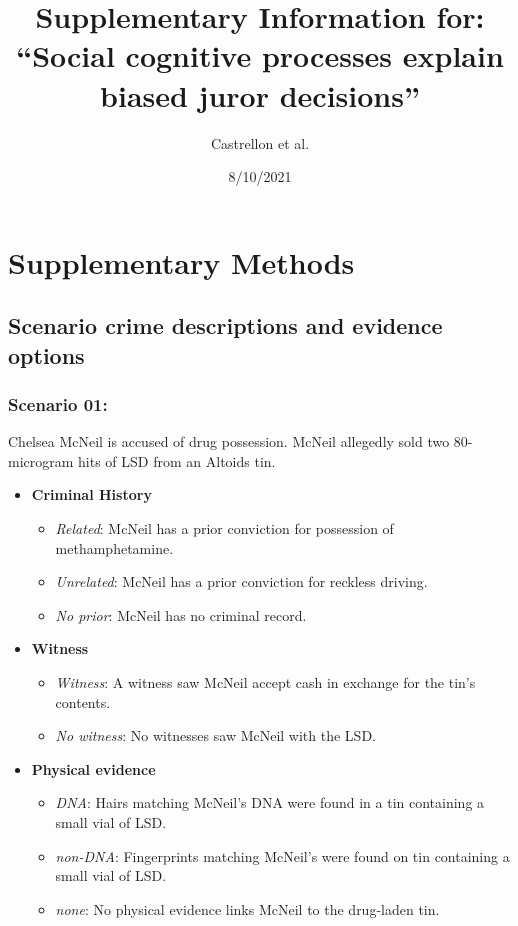 \documentclass[
]{article}
\title{Supplementary Information for:\\
``Social cognitive processes explain biased juror decisions''}
\author{Castrellon et al.}
\date{8/10/2021}
\providecommand{\tightlist}{%
  \setlength{\itemsep}{0pt}\setlength{\parskip}{0pt}}
\begin{document}
\maketitle

\captionsetup[table]{name=Supplementary Table}
\captionsetup[figure]{name=Supplementary Figure}

\hypertarget{supplementary-methods}{%
\section{Supplementary Methods}\label{supplementary-methods}}

\hypertarget{scenario-crime-descriptions-and-evidence-options}{%
\subsection{Scenario crime descriptions and evidence
options}\label{scenario-crime-descriptions-and-evidence-options}}

\hypertarget{scenario-01}{%
\subsubsection{Scenario 01:}\label{scenario-01}}

Chelsea McNeil is accused of drug possession. McNeil allegedly sold two
80-microgram hits of LSD from an Altoids tin.

\begin{itemize}
\tightlist
\item
  \textbf{Criminal History}

  \begin{itemize}
  \tightlist
  \item
    \emph{Related}: McNeil has a prior conviction for possession of
    methamphetamine.
  \item
    \emph{Unrelated}: McNeil has a prior conviction for reckless
    driving.
  \item
    \emph{No prior}: McNeil has no criminal record.
  \end{itemize}
\item
  \textbf{Witness}

  \begin{itemize}
  \tightlist
  \item
    \emph{Witness}: A witness saw McNeil accept cash in exchange for the
    tin's contents.
  \item
    \emph{No witness}: No witnesses saw McNeil with the LSD.
  \end{itemize}
\item
  \textbf{Physical evidence}

  \begin{itemize}
  \tightlist
  \item
    \emph{DNA}: Hairs matching McNeil's DNA were found in a tin
    containing a small vial of LSD.
  \item
    \emph{non-DNA}: Fingerprints matching McNeil's were found on tin
    containing a small vial of LSD.
  \item
    \emph{none}: No physical evidence links McNeil to the drug-laden
    tin.
  \end{itemize}
\end{itemize}
\end{document}
